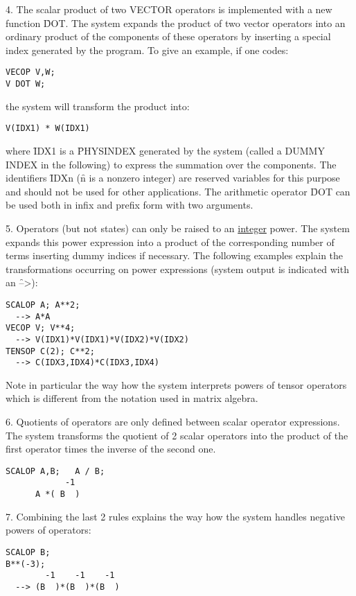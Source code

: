 4. The scalar product of two VECTOR operators is implemented
      with a new function \f{DOT}. The system expands
the product of
two vector operators into an ordinary product of the components of these
operators by inserting a special index generated by the program.
To give an example, if one codes:
\begin{verbatim}
VECOP V,W;
V DOT W;
\end{verbatim}
the system will transform the product into:
\begin{verbatim}
V(IDX1) * W(IDX1)
\end{verbatim}
where \f{IDX1} is a \f{PHYSINDEX} generated by the system (called a
DUMMY INDEX in the following) to express the summation over the
components.  The identifiers \f{IDXn} (\f{n} is a nonzero integer) are
reserved variables for this purpose and should not be used for other
applications. The arithmetic operator
\f{DOT} can be used both in infix and prefix form with two arguments.

5. Operators (but not states) can only be raised to an
\underline{integer} power. The system expands this power
expression into a product of the corresponding number of terms
inserting dummy indices if necessary. The following examples explain
the transformations occurring on power expressions (system output
is indicated with an \f{-->}):
\begin{verbatim}
SCALOP A; A**2;
  --> A*A
VECOP V; V**4;
  --> V(IDX1)*V(IDX1)*V(IDX2)*V(IDX2)
TENSOP C(2); C**2;
  --> C(IDX3,IDX4)*C(IDX3,IDX4)
\end{verbatim}
Note in particular the way how the system interprets powers of
tensor operators which is different from the notation used in matrix
algebra.

6. Quotients of operators are only defined between
scalar operator expressions.
The system transforms the quotient of 2 scalar operators into the
product of the first operator times the inverse of the second one.

\begin{verbatim}
SCALOP A,B;   A / B;
            -1
      A *( B  )
\end{verbatim}

7. Combining the  last 2 rules explains the way how the system
handles negative powers of operators:

\noindent
\begin{verbatim}
SCALOP B;
B**(-3);
        -1    -1    -1
  --> (B  )*(B  )*(B  )
\end{verbatim}

